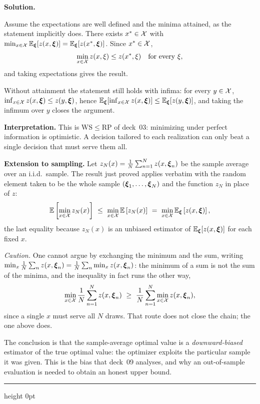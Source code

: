 \documentclass[11pt]{article}
\newenvironment{solution}
    {\par\nobreak\smallskip\noindent\textbf{Solution.}\par\nobreak\smallskip}
    {\par\medskip\hrule height 0pt\medskip}
\newcommand{\WSv}{\mathrm{WS}}
\newcommand{\RPv}{\mathrm{RP}}
\begin{document}
\begin{solution}
Assume the expectations are well defined and the minima attained, as the
statement implicitly does. There exists $x^* \in {\mathcal{X}}$ with
$\min_{x \in {\mathcal{X}}} {\mathbb{E}}_{{\boldsymbol{\xi}}}[z(x,{\boldsymbol{\xi}})] = {\mathbb{E}}_{{\boldsymbol{\xi}}}[z(x^*,{\boldsymbol{\xi}})]$. Since
$x^* \in {\mathcal{X}}$,
\[
\min_{x \in {\mathcal{X}}} z(x,\xi) \leq z(x^*,\xi) \quad \text{for every } \xi,
\]
and taking expectations gives the result.

Without attainment the statement still holds with infima: for every
$y \in {\mathcal{X}}$, $\inf_{x \in {\mathcal{X}}} z(x,{\boldsymbol{\xi}}) \leq z(y,{\boldsymbol{\xi}})$, hence
${\mathbb{E}}_{{\boldsymbol{\xi}}}[\inf_{x \in {\mathcal{X}}} z(x,{\boldsymbol{\xi}})] \leq {\mathbb{E}}_{{\boldsymbol{\xi}}}[z(y,{\boldsymbol{\xi}})]$, and
taking the infimum over $y$ closes the argument.

\textbf{Interpretation.} This is $\WSv \leq \RPv$ of deck~03: minimizing under
perfect information is optimistic. A decision tailored to each realization can
only beat a single decision that must serve them all.

\textbf{Extension to sampling.} Let
$z_N(x) = \frac{1}{N}\sum_{n=1}^N z(x,{\boldsymbol{\xi}}_n)$ be the sample average over an
i.i.d.\ sample. The result just proved applies verbatim with the random element
taken to be the whole sample $({\boldsymbol{\xi}}_1,\ldots,{\boldsymbol{\xi}}_N)$ and the function
$z_N$ in place of $z$:
\[
{\mathbb{E}}\left[ \min_{x \in {\mathcal{X}}} z_N(x) \right]
\ \leq\ \min_{x \in {\mathcal{X}}} {\mathbb{E}}\left[ z_N(x) \right]
\ =\ \min_{x \in {\mathcal{X}}} {\mathbb{E}}_{{\boldsymbol{\xi}}}\left[ z(x,{\boldsymbol{\xi}}) \right],
\]
the last equality because $z_N(x)$ is an unbiased estimator of
${\mathbb{E}}_{{\boldsymbol{\xi}}}[z(x,{\boldsymbol{\xi}})]$ for each fixed $x$.

\medskip
\emph{Caution.} One cannot argue by exchanging the minimum and the sum, writing
$\min_x \frac{1}{N}\sum_n z(x,{\boldsymbol{\xi}}_n) = \frac{1}{N}\sum_n \min_x z(x,{\boldsymbol{\xi}}_n)$:
the minimum of a sum is not the sum of the minima, and the inequality in fact
runs the other way,
\[
\min_{x \in {\mathcal{X}}} \frac{1}{N}\sum_{n=1}^N z(x,{\boldsymbol{\xi}}_n)
\ \geq\ \frac{1}{N}\sum_{n=1}^N \min_{x \in {\mathcal{X}}} z(x,{\boldsymbol{\xi}}_n),
\]
since a single $x$ must serve all $N$ draws. That route does not close the chain;
the one above does.

\medskip
The conclusion is that the sample-average optimal value is a
\emph{downward-biased} estimator of the true optimal value: the optimizer
exploits the particular sample it was given. This is the bias that deck~09
analyses, and why an out-of-sample evaluation is needed to obtain an honest upper
bound.
\end{solution}
\end{document}
